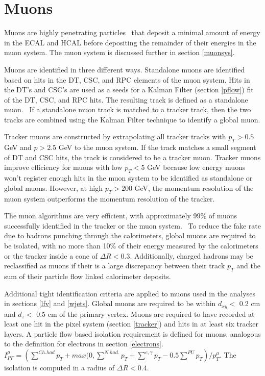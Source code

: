 \documentclass[oneside, letterpaper, oldfontcommands]{memoir}
\begin{document}
\section{Muons}\label{muons}
\qquad Muons are highly penetrating particles~\cite{Agashe:2014kda} that deposit a minimal amount of energy in the ECAL and HCAL before depositing the remainder of their energies in the muon system. The muon system is discussed further in section \ref{muonsys}. 

\qquad Muons are identified in three different ways. Standalone muons are identified based on hits in the DT, CSC, and RPC elements of the muon system. Hits in the DT's and CSC's are used as a seeds for a Kalman Filter (section \ref{pflow}) fit of the DT, CSC, and RPC hits. The resulting track is defined as a standalone muon.~\cite{Chatrchyan:2013sba} If a standalone muon track is matched to a tracker track, then the two tracks are combined using the Kalman Filter technique to identify a global muon. 

\qquad Tracker muons are constructed by extrapolating all tracker tracks with $p_{T} > 0.5$ GeV and $p > 2.5$ GeV to the muon system. If the track matches a small segment of DT and CSC hits, the track is considered to be a tracker muon. Tracker muons improve efficiency for muons with low $p_{T} < 5$ GeV because low energy muons won't register enough hits in the muon system to be identified as standalone or global muons. However, at high $p_{T} > 200$ GeV, the momentum resolution of the muon system outperforms the momentum resolution of the tracker.

\qquad The muon algorithms are very efficient, with approximately 99$\%$ of muons successfully identified in the tracker or the muon system.~\cite{Chatrchyan:2013sba} To reduce the fake rate due to hadrons punching through the calorimeters, global muons are required to be isolated, with no more than 10$\%$ of their energy measured by the calorimeters or the tracker inside a cone of $\Delta R < 0.3$. Additionally, charged hadrons may be reclassified as muons if their is a large discrepancy between their track $p_{T}$ and the sum of their particle flow linked calorimeter deposits. 

\qquad Additional tight identification criteria are applied to muons used in the analyses in sections \ref{lfv} and \ref{wjets}. Global muons are required to be within $d_{xy} <$ 0.2 cm and $d_{z} <$ 0.5 cm of the primary vertex. Muons are required to have recorded at least one hit in the pixel system (section \ref{tracker}) and hits in at least six tracker layers. A particle flow based isolation requirement is defined for muons, analogous to the definition for electrons in section \ref{electrons}. 
$I_{PF}^{\mu} = \left(\sum\limits^{Ch. had} p_{T} + max(0, \sum\limits^{N. had.} p_{T} + \sum\limits^{e,\gamma} p_{T} - 0.5 \sum\limits^{PU} p_{T}\right)/p_{T}^{\mu}$. The isolation is computed in a radius of $\Delta R < 0.4$. 
\end{document}
